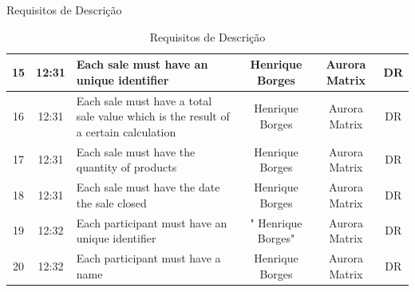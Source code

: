\documentclass[compress,svgnames,handout,13.7pt]{beamer}
\begin{document}
\begin{frame}{Requisitos de Descrição}
\begin{table}[h]
{\begin{tabular}{ | c | c |p{10.5cm} | c | c | c |}
        15 & 12:31 & Each sale must have an unique identifier & Henrique Borges & Aurora Matrix & DR \\ \hline
        16 & 12:31 & Each sale must have a total sale value which is the result of a certain calculation & Henrique Borges & Aurora Matrix & DR \\ \hline
        17 & 12:31 & Each sale must have the quantity of products & Henrique Borges & Aurora Matrix & DR \\ \hline
        18 & 12:31 & Each sale must have the date the sale closed & Henrique Borges & Aurora Matrix & DR \\ \hline
        19 & 12:32 & Each participant must have an unique identifier & " Henrique Borges" & Aurora Matrix & DR \\ \hline
        20 & 12:32 & Each participant must have a name & Henrique Borges & Aurora Matrix & DR \\ \hline
        \end{tabular}%
    }
    \caption{Requisitos de Descrição}
    \end{table}
\end{frame}
\end{document}
